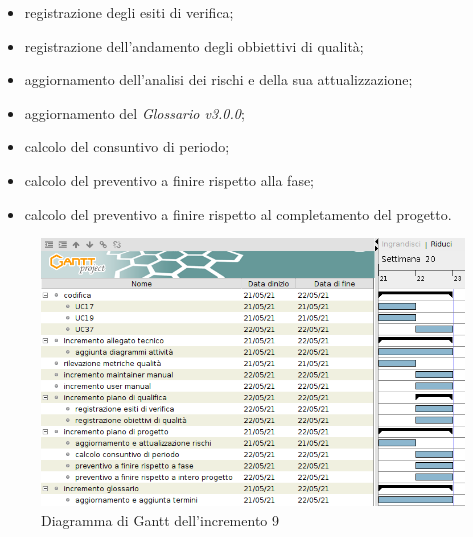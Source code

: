 \begin{itemize}
\begin{itemize}
              \item registrazione degli esiti di verifica;
              \item registrazione dell'andamento degli obbiettivi di qualità;
              \item aggiornamento dell'analisi dei rischi e della sua attualizzazione;
              \item aggiornamento del \textit{Glossario v3.0.0};
              \item calcolo del consuntivo di periodo;
              \item calcolo del preventivo a finire rispetto alla fase;
              \item calcolo del preventivo a finire rispetto al completamento del progetto.
          \end{itemize}
\end{itemize}
\begin{figure}[!ht]
    \caption{Diagramma di Gantt dell'incremento 9}
    \vspace{5px}
    \includegraphics[scale=0.3]{../../../Images/Diagrammi/Gantt/incremento9.png}
    \centering
\end{figure}
\pagebreak
